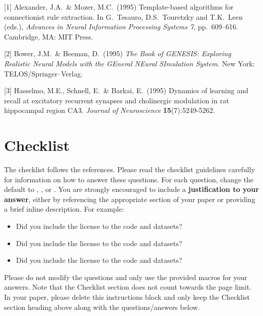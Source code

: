 \documentclass{article}
\begin{document}
{
\small


[1] Alexander, J.A.\ \& Mozer, M.C.\ (1995) Template-based algorithms for
connectionist rule extraction. In G.\ Tesauro, D.S.\ Touretzky and T.K.\ Leen
(eds.), {\it Advances in Neural Information Processing Systems 7},
pp.\ 609--616. Cambridge, MA: MIT Press.


[2] Bower, J.M.\ \& Beeman, D.\ (1995) {\it The Book of GENESIS: Exploring
  Realistic Neural Models with the GEneral NEural SImulation System.}  New York:
TELOS/Springer--Verlag.


[3] Hasselmo, M.E., Schnell, E.\ \& Barkai, E.\ (1995) Dynamics of learning and
recall at excitatory recurrent synapses and cholinergic modulation in rat
hippocampal region CA3. {\it Journal of Neuroscience} {\bf 15}(7):5249-5262.
}


\section*{Checklist}


The checklist follows the references.  Please
read the checklist guidelines carefully for information on how to answer these
questions.  For each question, change the default \answerTODO{} to \answerYes{},
\answerNo{}, or \answerNA{}.  You are strongly encouraged to include a {\bf
justification to your answer}, either by referencing the appropriate section of
your paper or providing a brief inline description.  For example:
\begin{itemize}
  \item Did you include the license to the code and datasets? 
  \item Did you include the license to the code and datasets? 
  \item Did you include the license to the code and datasets? \answerNA{}
\end{itemize}
Please do not modify the questions and only use the provided macros for your
answers.  Note that the Checklist section does not count towards the page
limit.  In your paper, please delete this instructions block and only keep the
Checklist section heading above along with the questions/answers below.
\end{document}
